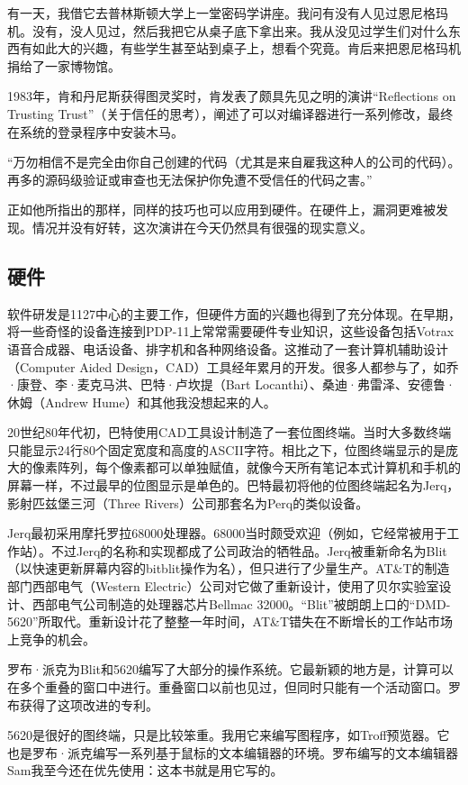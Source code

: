 \documentclass[a4paper,12pt,UTF8,twoside]{ctexbook}
\begin{document}
有一天，我借它去普林斯顿大学上一堂密码学讲座。我问有没有人见过恩尼格玛机。没有，没人见过，然后我把它从桌子底下拿出来。我从没见过学生们对什么东西有如此大的兴趣，有些学生甚至站到桌子上，想看个究竟。肯后来把恩尼格玛机捐给了一家博物馆。

1983年，肯和丹尼斯获得图灵奖时，肯发表了颇具先见之明的演讲“Reflections on Trusting Trust”（关于信任的思考），阐述了可以对编译器进行一系列修改，最终在系统的登录程序中安装木马。

“万勿相信不是完全由你自己创建的代码（尤其是来自雇我这种人的公司的代码）。再多的源码级验证或审查也无法保护你免遭不受信任的代码之害。”

正如他所指出的那样，同样的技巧也可以应用到硬件。在硬件上，漏洞更难被发现。情况并没有好转，这次演讲在今天仍然具有很强的现实意义。

\subsection{硬件}

软件研发是1127中心的主要工作，但硬件方面的兴趣也得到了充分体现。在早期，将一些奇怪的设备连接到PDP-11上常常需要硬件专业知识，这些设备包括Votrax语音合成器、电话设备、排字机和各种网络设备。这推动了一套计算机辅助设计（Computer Aided Design，CAD）工具经年累月的开发。很多人都参与了，如乔·康登、李·麦克马洪、巴特·卢坎提（Bart Locanthi）、桑迪·弗雷泽、安德鲁·休姆（Andrew Hume）和其他我没想起来的人。

20世纪80年代初，巴特使用CAD工具设计制造了一套位图终端。当时大多数终端只能显示24行80个固定宽度和高度的ASCII字符。相比之下，位图终端显示的是庞大的像素阵列，每个像素都可以单独赋值，就像今天所有笔记本式计算机和手机的屏幕一样，不过最早的位图显示是单色的。巴特最初将他的位图终端起名为Jerq，影射匹兹堡三河（Three Rivers）公司那套名为Perq的类似设备。

Jerq最初采用摩托罗拉68000处理器。68000当时颇受欢迎（例如，它经常被用于工作站）。不过Jerq的名称和实现都成了公司政治的牺牲品。Jerq被重新命名为Blit（以快速更新屏幕内容的bitblit操作为名），但只进行了少量生产。AT\&T的制造部门西部电气（Western Electric）公司对它做了重新设计，使用了贝尔实验室设计、西部电气公司制造的处理器芯片Bellmac 32000。“Blit”被朗朗上口的“DMD-5620”所取代。重新设计花了整整一年时间，AT\&T错失在不断增长的工作站市场上竞争的机会。

罗布·派克为Blit和5620编写了大部分的操作系统。它最新颖的地方是，计算可以在多个重叠的窗口中进行。重叠窗口以前也见过，但同时只能有一个活动窗口。罗布获得了这项改进的专利。

5620是很好的图终端，只是比较笨重。我用它来编写图程序，如Troff预览器。它也是罗布·派克编写一系列基于鼠标的文本编辑器的环境。罗布编写的文本编辑器Sam我至今还在优先使用：这本书就是用它写的。
\end{document}
